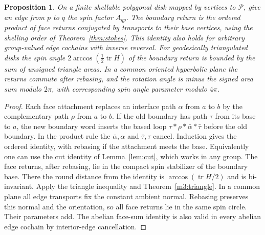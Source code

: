 \documentclass[11pt,reqno]{amsart}
\newtheorem{proposition}[theorem]{Proposition}
\theoremstyle{definition}
\theoremstyle{remark}
\numberwithin{equation}{section}
\begin{document}
\begin{proposition}\label{m3:finite}
On a finite shellable polygonal disk mapped by vertices to \(\mathcal P\),
give an edge from \(p\) to \(q\) the spin factor \(A_{qp}\).
The boundary return is the ordered product of face returns
conjugated by transports to their base vertices, using the
shelling order of Theorem~\ref{thm:stokes}. This identity also
holds for arbitrary group-valued edge cochains with inverse
reversal. For geodesically triangulated disks the spin angle
\(2\arccos(\tfrac12\operatorname{tr}H)\) of the boundary return is
bounded by the sum of unsigned triangle areas. In a common
oriented hyperbolic plane the returns commute after rebasing,
and the rotation angle is minus the signed area sum modulo \(2\pi\),
with corresponding spin angle parameter modulo \(4\pi\).
\end{proposition}
\begin{proof}
Each face attachment replaces an interface path \(\alpha\) from
\(a\) to \(b\) by the complementary path \(\rho\) from \(a\) to
\(b\). If the old boundary has path \(\tau\) from its base to
\(a\), the new boundary word inserts the based loop
\(\tau*\rho*\bar\alpha*\bar\tau\) before the old boundary.
In the product rule the \(\bar\alpha,\alpha\) and
\(\bar\tau,\tau\) cancel. Induction gives the ordered identity,
with rebasing if the attachment meets the base. Equivalently one
can use the cut identity of Lemma~\ref{lem:cut}, which works in
any group. The face returns, after rebasing, lie in the compact
spin stabilizer of the boundary base. There the round distance
from the identity is \(\arccos(\operatorname{tr}H/2)\) and is
bi-invariant. Apply the triangle inequality and
Theorem~\ref{m3:triangle}. In a common plane all edge transports
fix the constant ambient normal. Rebasing preserves this normal
and the orientation, so all face returns lie in the same spin
circle. Their parameters add. The abelian face-sum identity is
also valid in every abelian edge cochain by interior-edge
cancellation.
\end{proof}
\end{document}
